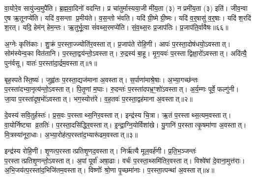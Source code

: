 वा॒योरे॒व सायु॑ज्य॒मुपै॑ति।
ब्र॒ह्म॒वा॒दिनो॑ वदन्ति।
प्र चा॑तुर्मास्यया॒जी मी॑य॒ता (३) न प्रमी॑य॒ता (३) इति॑।
जीव॒न्वा ए॒ष ऋ॒तूनप्ये॑ति।
यदि॑ व॒सन्ता प्र॒मीय॑ते।
व॒स॒न्तो भ॑वति।
यदि॑ ग्री॒ष्मे ग्री॒ष्मः।
यदि॑ व॒र्॒षासु॑ व॒र्॒षाः।
यदि॑ श॒रदि॑ श॒रत्।
यदि॒ हेम॑न् हेम॒न्तः।
ऋ॒तुर्भू॒त्वा सं॑वथ्स॒रमप्ये॑ति।
सं॒व॒थ्स॒रः प्र॒जाप॑तिः।
प्र॒जाप॑ति॒र्वावैषः॥६६॥






\clearpage
{}
\setcounter{anuvakam}{0}

अ॒ग्नेः कृत्ति॑काः।
शु॒क्रं प॒रस्ता॒ज्ज्योति॑र॒वस्तात्।
प्र॒जाप॑ते रोहि॒णी।
आपः॑ प॒रस्ता॒दोष॑धयो॒\-ऽवस्तात्।
सोम॑स्येन्व॒का वित॑तानि।
प॒रस्ता॒द्वय॑न्तो॒\-ऽवस्तात्।
रु॒द्रस्य॑ बा॒हू।
मृ॒ग॒यवः॑ प॒रस्ताद्विक्षा॒रो॑\-ऽवस्तात्।
अदि॑त्यै॒ पुन॑र्वसू।
वातः॑ प॒रस्ता॑दा॒र्द्रम॒वस्तात्॥१॥

बृह॒स्पतेस्ति॒ष्यः॑।
जुह्व॑तः प॒रस्ता॒द्यज॑माना अ॒वस्तात्।
स॒र्पाणा॑माश्रे॒षाः।
अ॒भ्या॒गच्छ॑न्तः प॒रस्ता॑दभ्या॒नृत्य॑न्तो॒\-ऽवस्तात्।
पि॒तृ॒णां म॒घाः।
रु॒दन्तः॑ प॒रस्ता॑दपभ्र॒ꣳ॒शो॑\-ऽवस्तात्।
अ॒र्य॒म्णः पूर्वे॒ फल्गु॑नी।
जा॒या प॒रस्ता॑दृष॒भो॑\-ऽवस्तात्।
भग॒स्योत्त॑रे।
व॒ह॒तवः॑ प॒रस्ता॒द्वह॑माना अ॒वस्तात्॥२॥

दे॒वस्य॑ सवि॒तुर्\mbox{}हस्तः॑।
प्र॒स॒वः प॒रस्ताथ्स॒निर॒वस्तात्।
इन्द्र॑स्य चि॒त्रा।
ऋ॒तं प॒रस्ताथ्स॒त्यम॒वस्तात्।
वा॒योर्निष्ट्या व्र॒ततिः॑।
प॒रस्ता॒दसि॑द्धिर॒वस्तात्।
इ॒न्द्रा॒ग्नि॒योर्विशा॑खे।
यु॒गानि॑ प॒रस्तात्कृ॒षमा॑णा अ॒वस्तात्।
मि॒त्रस्या॑नूरा॒धाः।
अ॒भ्या॒रोह॑त्प॒रस्ता॑द॒भ्यारू॑ढम॒वस्तात्॥३॥

इन्द्र॑स्य रोहि॒णी।
शृ॒णत्प॒रस्तात्प्रतिशृ॒णद॒वस्तात्।
निर्\mbox{}ऋ॑त्यै मूल॒वर्\mbox{}ह॑णी।
प्र॒ति॒भ॒ञ्जन्तः॑ प॒रस्तात्प्रतिशृ॒णन्तो॒\-ऽवस्तात्।
अ॒पां पूर्वा॑ अषा॒ढाः।
वर्चः॑ प॒रस्ता॒थ्समि॑तिर॒वस्तात्।
विश्वे॑षां दे॒वाना॒मुत्त॑राः।
अ॒भि॒जय॑त्प॒रस्ता॑द॒भिजि॑तम॒वस्तात्।
विष्णोः᳚ श्रो॒णा पृ॒च्छमा॑नाः।
प॒रस्ता॒त्पन्था॑ अ॒वस्तात्॥४॥

